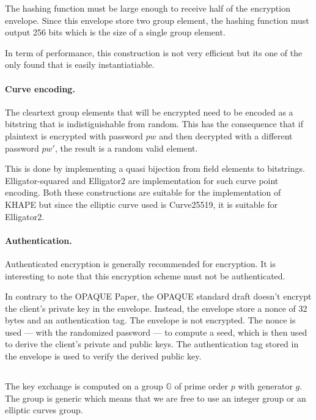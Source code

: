 \documentclass[../report.tex]{subfiles}
\begin{document}
The hashing function must be large enough to receive half of the encryption envelope. Since this envelope store two group element, the hashing function must output 256 bits which is the size of a single group element.

In term of performance, this construction is not very efficient but its one of the only found that is easily instantiatiable.



\paragraph{Curve encoding.}
The cleartext group elements that will be encrypted need to be encoded as a bitstring that is indistiguishable from random. This has the consequence that if plaintext is encrypted with password $pw$ and then decrypted with a different password $pw'$, the result is a random valid element.



This is done by implementing a quasi bijection from field elements to bitstrings.
Elligator-squared \cite{Elligator_Squared_Paper} and Elligator2 \cite{Elligator2_Paper} are implementation for such curve point encoding.
Both these constructions are suitable for the implementation of KHAPE but since the elliptic curve used is Curve25519, it is suitable for Elligator2.

\paragraph{Authentication.}
Authenticated encryption is generally recommended for encryption.
It is interesting to note that this encryption scheme must not be authenticated. 



In contrary to the OPAQUE Paper, the OPAQUE standard draft doesn't encrypt the client's private key in the envelope.
Instead, the envelope store a nonce of 32 bytes and an authentication tag. The envelope is not encrypted.
The nonce is used --- with the randomized password --- to compute a seed, which is then used to derive the client's private and public keys. The authentication tag stored in the envelope is used to verify the derived public key.





\subsection{}
The key exchange is computed on a group $\mathbb{G}$ of prime order $p$ with generator $g$.
The group is generic which means that we are free to use an integer group or an elliptic curves group.
\end{document}
